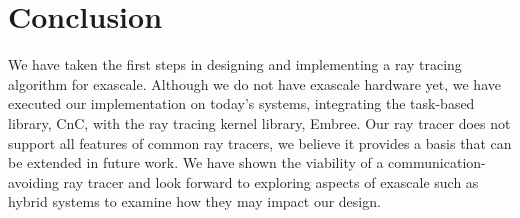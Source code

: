 \section{Conclusion}
\label{sec:conclusion}

We have taken the first steps in designing and implementing a ray tracing
algorithm for exascale.  Although we do not have exascale hardware yet, we have 
executed our implementation on today's systems, integrating the task-based 
library, CnC, with the ray tracing kernel library, Embree.  Our ray tracer does
not support all features of common ray tracers, we believe it provides a basis
that can be extended in future work.  We have shown the viability of a
communication-avoiding ray tracer and look forward to exploring aspects of
exascale such as hybrid systems to examine how they may impact our design.
